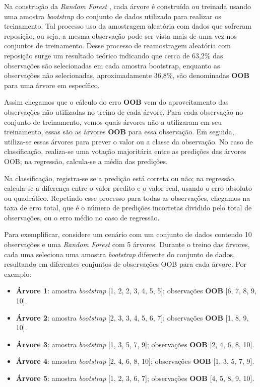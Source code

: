 \documentclass[a4paper,12pt]{article}[abntex2]
\begin{document}
Na construção da \textit{Random Forest} , cada árvore é construída ou treinada usando uma amostra \textit{bootstrap} do conjunto de dados utilizado para realizar os treinamento. Tal processo uso da amostragem aleatória com dados que sofreram reposição, ou seja, a mesma observação pode ser vista mais de uma vez nos conjuntos de treinamento. Desse processo de reamostragem aleatória com reposição surge um resultado teórico indicando que cerca de 63,2\% das observações são selecionadas em cada amostra bootstrap, enquanto as observações não selecionadas, aproximadamente 36,8\%, são denominadas \textbf{OOB} para uma árvore em específico.

Assim chegamos que o cálculo do erro \textbf{OOB} vem do aproveitamento das observações não utilizadas no treino de cada árvore. Para cada observação no conjunto de treinamento, vemos quais árvores não a utilizaram em seu treinamento, essas são as árvores \textbf{OOB} para essa observação. Em seguida,.  utiliza-se essas árvores para prever o valor ou a classe da observação. No caso de classificação, realiza-se uma votação majoritária entre as predições das árvores OOB; na regressão, calcula-se a média das predições.

Na classificação, registra-se se a predição está correta ou não; na regressão, calcula-se a diferença entre o valor predito e o valor real, usando o erro absoluto ou quadrático. Repetindo esse processo para todas as observações, chegamos na taxa de erro total, que é o número de predições incorretas dividido pelo total de observações, ou o erro médio no caso de regressão.

Para exemplificar, considere um cenário com um conjunto de dados contendo 10 observações e uma \textit{Random Forest} com 5 árvores. Durante o treino das árvores, cada uma seleciona uma amostra \textit{bootstrap} diferente do conjunto de dados, resultando em diferentes conjuntos de observações OOB para cada árvore. Por exemplo: \begin{itemize}
    \item \textbf{Árvore 1}: amostra \textit{bootstrap} [1, 2, 2, 3, 4, 5, 5]; observações \textbf{OOB} [6, 7, 8, 9, 10].
    \item \textbf{Árvore 2}: amostra \textit{bootstrap} [2, 3, 3, 4, 5, 6, 7]; observações \textbf{OOB} [1, 8, 9, 10].
    \item \textbf{Árvore 3}: amostra \textit{bootstrap} [1, 3, 5, 7, 9]; observações \textbf{OOB} [2, 4, 6, 8, 10].
    \item \textbf{Árvore 4}: amostra \textit{bootstrap} [2, 4, 6, 8, 10]; observações \textbf{OOB} [1, 3, 5, 7, 9].
    \item \textbf{Árvore 5}: amostra \textit{bootstrap} [1, 2, 3, 6, 7]; observações \textbf{OOB} [4, 5, 8, 9, 10].
\end{itemize}
\end{document}
